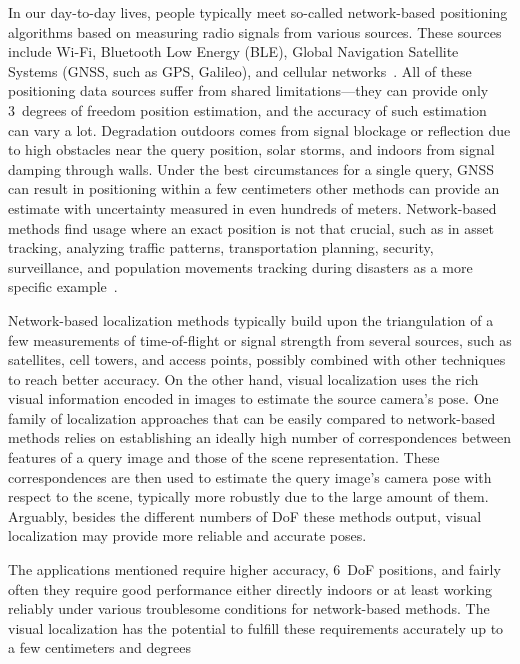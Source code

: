 In our day-to-day lives, people typically meet so-called network-based positioning algorithms based on measuring
radio signals from various sources. These sources include Wi-Fi, Bluetooth Low Energy (BLE), Global Navigation
Satellite Systems (GNSS, such as GPS, Galileo), and cellular networks~\citep{Trogh2019}. All of these positioning
data sources suffer from shared limitations---they
can provide only 3~degrees of freedom position estimation, and the accuracy of such estimation can vary a lot.
Degradation outdoors comes from signal blockage or reflection due to high obstacles near the query position,
solar storms, and indoors from signal damping through walls. Under the
best circumstances for a single query, GNSS can result in positioning within a few
centimeters
other methods can provide an estimate with uncertainty measured in even hundreds of meters. Network-based methods
find usage where an exact position is not that crucial, such as in asset tracking,
analyzing traffic patterns, transportation planning, security, surveillance, and population
movements tracking during disasters as a more specific example~\citep{Trogh2019}.

Network-based localization methods typically build upon the triangulation of a few measurements
of time-of-flight or signal strength from several sources, such as satellites, cell towers,
and access points, possibly combined with other techniques to reach better accuracy.
On the other hand, visual localization uses the rich visual information encoded in images to
estimate the source camera's pose. One family of localization approaches that can be easily compared to
network-based methods relies on establishing an ideally high number of correspondences between
features of a query image and those of the scene representation. These correspondences are then
used to estimate the query image's camera pose with respect to the scene, typically more robustly
due to the large amount of them. Arguably, besides the different numbers of DoF these methods output,
visual localization may provide more reliable and accurate poses.

The applications mentioned require higher accuracy, 6~DoF positions, and fairly often they
require good performance either directly indoors or at least working reliably under various troublesome conditions for
network-based methods. The visual localization has the potential to fulfill these
requirements accurately up to a few centimeters and
degrees

